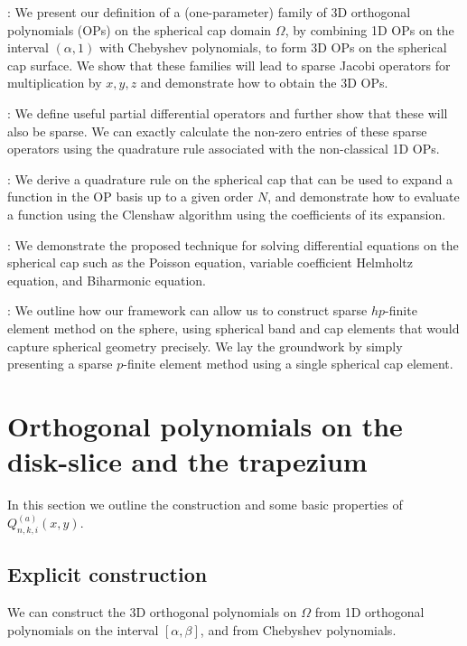 \documentclass[11pt, oneside]{article}   	%
\newcommand{\scop}{Q}
\newcommand{\scopnki}{\scop_{n,k,i}}
\newcommand{\scopnkia}{\scopnki^{(a)}}
\begin{document}
\noindent {}: We present our definition of a (one-parameter) family of 3D orthogonal polynomials (OPs) on the spherical cap domain $\Omega$, by combining 1D OPs on the interval $(\alpha, 1)$ with Chebyshev polynomials, to form 3D OPs on the spherical cap surface. We show that these families will lead to sparse Jacobi operators for multiplication by $x, y, z$ and demonstrate how to obtain the 3D OPs.

\noindent{}: We define useful partial differential operators and further show that these will also be sparse. We can exactly calculate the non-zero entries of these sparse operators using the quadrature rule associated with the non-classical 1D OPs.

\noindent{}: We derive a quadrature rule on the spherical cap that can be used to expand a function in the OP basis up to a given order $N$, and demonstrate how to evaluate a function using the Clenshaw algorithm using the coefficients of its expansion.

\noindent{}: We demonstrate the proposed technique for solving differential equations on the spherical cap such as the Poisson equation, variable coefficient Helmholtz equation, and Biharmonic equation.  

\noindent{}: We outline how our framework can allow us to construct sparse $hp$-finite element method on the sphere, using spherical band and cap elements that would capture spherical geometry precisely. We lay the groundwork by simply presenting a sparse $p$-finite element method using a single spherical cap element. 


\section{Orthogonal polynomials on the disk-slice and the trapezium}\label{Section:OPs}

In this section we outline the construction and some basic properties of $\scopnkia(x,y)$.

\subsection{Explicit construction}

We can construct the 3D orthogonal polynomials on $\Omega$ from 1D orthogonal polynomials on the interval \([\alpha,\beta]\), and from Chebyshev polynomials. 
\end{document}
